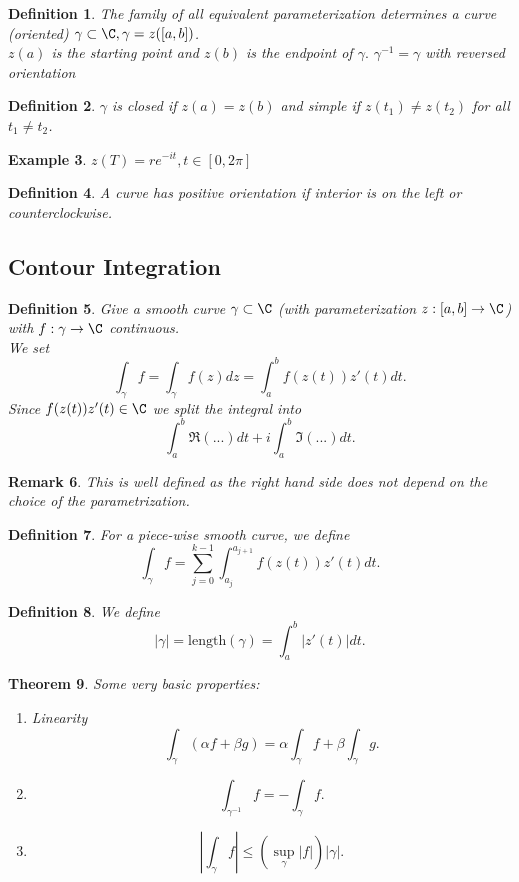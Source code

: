 \documentclass[a4paper]{article}
\newtheorem{thm}{Theorem}[section]
\newtheorem{defn}[thm]{Definition}
\newtheorem{eg}[thm]{Example}
\newtheorem{rmk}[thm]{Remark}
\begin{document}
\begin{defn}
    The family of all equivalent parameterization determines a curve (oriented) $\gamma \subset \C, \gamma = z([a,b])$. \\
    $z(a)$ is the starting point and $z(b)$ is the endpoint of $\gamma.$ $\gamma^{-1}=\gamma$ with reversed orientation
\end{defn}
\begin{defn}
    $\gamma$ is closed if $z(a)=z(b)$ and simple if $z(t_1)\neq z(t_2)$ for all $t_1\neq t_2$. 
\end{defn}
\begin{eg}
    $z(T)=re^{-it}, t\in [0,2\pi]$\\
\end{eg}
\begin{defn}
    A curve has positive orientation if interior is on the left or counterclockwise.
\end{defn}
\subsection{Contour Integration}
\begin{defn}
    Give a smooth curve $\gamma \subset \C$ (with parameterization $z:[a,b]\to\C$) with $f:\gamma \to \C$ continuous.\\
    We set 
    \[
    \int_\gamma f=\int_\gamma f(z)dz = \int_{a}^bf(z(t))z'(t)dt
    .\] 
    Since $f(z(t))z'(t)\in \C$ we split the integral into \[
    \int_a^b\Re(...)dt+i\int_a^b\Im(...)dt
    .\]  
\end{defn}
\begin{rmk}
    This is well defined as the right hand side does not depend on the choice of the parametrization. 
\end{rmk}
\begin{defn}
    For a piece-wise smooth curve, we define \[
    \int_\gamma f=\sum_{j=0}^{k-1}\int_{a_j}^{a_{j+1}}f(z(t))z'(t)dt
    .\] 
\end{defn}
\begin{defn}
    We define \[
    |\gamma|= \text{length}(\gamma)=\int_{a}^{b}|z'(t)|dt
    .\] 
\end{defn}
\begin{thm}
    Some very basic properties:
    \begin{enumerate}
        \item Linearity \[
        \int_\gamma (\alpha f+ \beta g)=\alpha \int_\gamma f +\beta \int_\gamma g
        .\] 
        \item \[
        \int_{\gamma^{-1}}f=-\int_{\gamma}f
        .\] 
        \item \[
        \left |\int_\gamma f\right |\leq  \left( \sup_\gamma |f| \right)|\gamma|
        .\] 
    \end{enumerate}
\end{thm}
\end{document}
